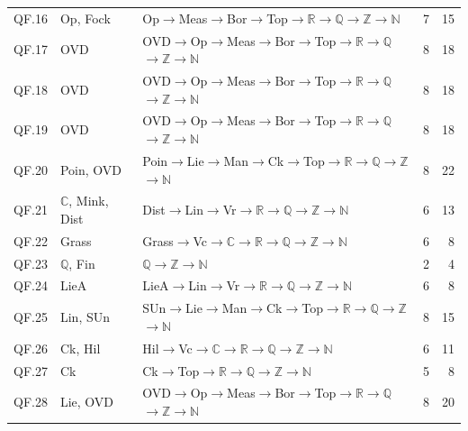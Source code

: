 {\begin{longtable}{l p{4.6cm} p{7.4cm} r r}
QF.16 & \textsf{Op}, \textsf{Fock} & \textsf{Op}$\to$\textsf{Meas}$\to$\textsf{Bor}$\to$\textsf{Top}$\to$$\mathbb R$$\to$$\mathbb Q$$\to$$\mathbb Z$$\to$$\mathbb N$ & 7 & 15 \\
QF.17 & \textsf{OVD} & \textsf{OVD}$\to$\textsf{Op}$\to$\textsf{Meas}$\to$\textsf{Bor}$\to$\textsf{Top}$\to$$\mathbb R$$\to$$\mathbb Q$$\to$$\mathbb Z$$\to$$\mathbb N$ & 8 & 18 \\
QF.18 & \textsf{OVD} & \textsf{OVD}$\to$\textsf{Op}$\to$\textsf{Meas}$\to$\textsf{Bor}$\to$\textsf{Top}$\to$$\mathbb R$$\to$$\mathbb Q$$\to$$\mathbb Z$$\to$$\mathbb N$ & 8 & 18 \\
QF.19 & \textsf{OVD} & \textsf{OVD}$\to$\textsf{Op}$\to$\textsf{Meas}$\to$\textsf{Bor}$\to$\textsf{Top}$\to$$\mathbb R$$\to$$\mathbb Q$$\to$$\mathbb Z$$\to$$\mathbb N$ & 8 & 18 \\
QF.20 & \textsf{Poin}, \textsf{OVD} & \textsf{Poin}$\to$\textsf{Lie}$\to$\textsf{Man}$\to$\textsf{Ck}$\to$\textsf{Top}$\to$$\mathbb R$$\to$$\mathbb Q$$\to$$\mathbb Z$$\to$$\mathbb N$ & 8 & 22 \\
QF.21 & $\mathbb C$, \textsf{Mink}, \textsf{Dist} & \textsf{Dist}$\to$\textsf{Lin}$\to$\textsf{Vr}$\to$$\mathbb R$$\to$$\mathbb Q$$\to$$\mathbb Z$$\to$$\mathbb N$ & 6 & 13 \\
QF.22 & \textsf{Grass} & \textsf{Grass}$\to$\textsf{Vc}$\to$$\mathbb C$$\to$$\mathbb R$$\to$$\mathbb Q$$\to$$\mathbb Z$$\to$$\mathbb N$ & 6 & 8 \\
QF.23 & $\mathbb Q$, \textsf{Fin} & $\mathbb Q$$\to$$\mathbb Z$$\to$$\mathbb N$ & 2 & 4 \\
QF.24 & \textsf{LieA} & \textsf{LieA}$\to$\textsf{Lin}$\to$\textsf{Vr}$\to$$\mathbb R$$\to$$\mathbb Q$$\to$$\mathbb Z$$\to$$\mathbb N$ & 6 & 8 \\
QF.25 & \textsf{Lin}, \textsf{SUn} & \textsf{SUn}$\to$\textsf{Lie}$\to$\textsf{Man}$\to$\textsf{Ck}$\to$\textsf{Top}$\to$$\mathbb R$$\to$$\mathbb Q$$\to$$\mathbb Z$$\to$$\mathbb N$ & 8 & 15 \\
QF.26 & \textsf{Ck}, \textsf{Hil} & \textsf{Hil}$\to$\textsf{Vc}$\to$$\mathbb C$$\to$$\mathbb R$$\to$$\mathbb Q$$\to$$\mathbb Z$$\to$$\mathbb N$ & 6 & 11 \\
QF.27 & \textsf{Ck} & \textsf{Ck}$\to$\textsf{Top}$\to$$\mathbb R$$\to$$\mathbb Q$$\to$$\mathbb Z$$\to$$\mathbb N$ & 5 & 8 \\
QF.28 & \textsf{Lie}, \textsf{OVD} & \textsf{OVD}$\to$\textsf{Op}$\to$\textsf{Meas}$\to$\textsf{Bor}$\to$\textsf{Top}$\to$$\mathbb R$$\to$$\mathbb Q$$\to$$\mathbb Z$$\to$$\mathbb N$ & 8 & 20 \\

\end{longtable}}

